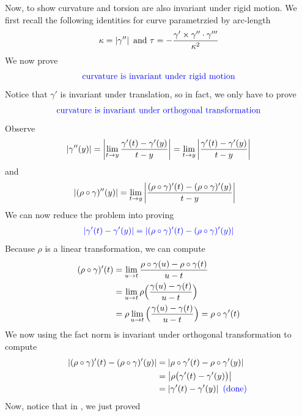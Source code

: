 \documentclass{report}
\begin{document}
Now, to show curvature and torsion are also invariant under rigid motion. We first recall the following identities for curve parametrzied by arc-length 
\begin{align*}
\kappa = \left|\gamma ''\right|\text{ and }\tau = -\frac{\gamma ' \times \gamma '' \cdot \gamma '''}{\kappa ^2}
\end{align*}
We now prove 
\begin{align*}
\textcolor{blue}{\text{ curvature is invariant under rigid motion }}
\end{align*}
Notice that $\gamma '$ is invariant under translation, so in fact, we only have to prove 
\begin{align*}
\textcolor{blue}{\text{ curvature is invariant under orthogonal transformation }}
\end{align*}
Observe 
\begin{align*}
\left|\gamma ''(y)\right|=\left|\lim_{t\to y}\frac{\gamma '(t)-\gamma '(y)}{t-y}\right|=\lim_{t\to y}\left|\frac{\gamma '(t)-\gamma '(y)}{t-y}\right|
\end{align*}
and 
\begin{align*}
\left|(\rho \circ \gamma )''(y)\right|&=\lim_{t\to y}\left|\frac{(\rho \circ \gamma )'(t)-(\rho\circ \gamma )'(y)}{t-y}\right|
\end{align*}
We can now reduce the problem into proving 
\begin{align*}
  \textcolor{blue}{\left|\gamma '(t)-\gamma '(y)\right|=\left|(\rho \circ \gamma )'(t)-(\rho \circ \gamma )'(y)\right|}
\end{align*}
Because $\rho$ is a linear transformation, we can compute 
\begin{align}
\label{rho'}
(\rho \circ \gamma )'(t)&=\lim_{u\to t} \frac{\rho \circ \gamma (u)-\rho \circ \gamma (t)}{u-t}\notag\\
&=\lim_{u\to t}\rho\Big( \frac{\gamma (u)-\gamma (t)}{u-t}\Big)\notag\\
&=\rho\lim_{u\to t}\Big( \frac{\gamma (u)-\gamma (t)}{u-t}\Big)=\rho \circ \gamma '(t)
\end{align}
We now using the fact norm is invariant under orthogonal transformation to compute 
\begin{align*}
\left|(\rho \circ  \gamma )'(t)-(\rho \circ \gamma )'(y)\right|&= \left|\rho \circ \gamma '(t)-\rho \circ  \gamma '(y)\right|\\
&=\left|\rho \big(\gamma '(t)-\gamma '(y) \big)\right|\\
&=\left|\gamma '(t)-\gamma '(y)\right|\textcolor{blue}{\text{ (done) }}
\end{align*}
Now, notice that in , we just proved 
\end{document}
